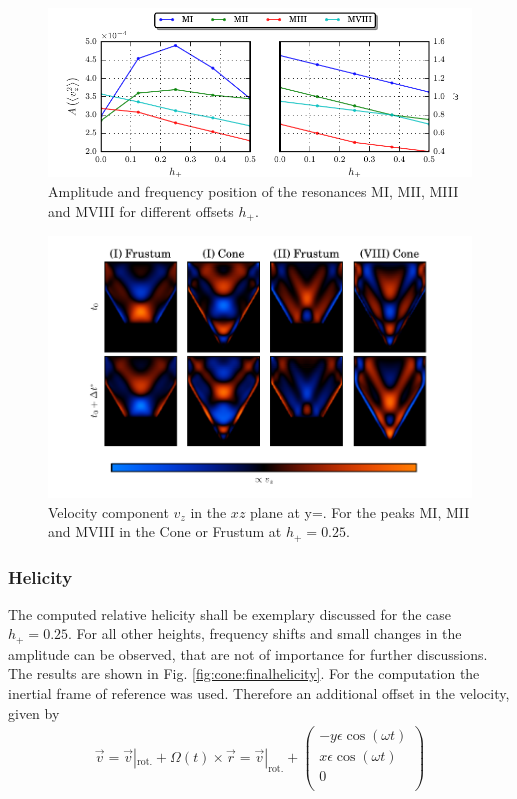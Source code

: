 \begin{figure}[!tp]
  \centering
  \includegraphics{gfx/cone/final/amp_pos.pdf}
  \caption{
      \label{fig:cone:finalampmax}
      Amplitude and frequency position of the resonances M\RN{1}, M\RN{2}, M\RN{3} and M\RN{8}
      for different offsets $h_+$.
    }
\end{figure}
\begin{figure}[!bp]
  \centering
  \includegraphics{gfx/cone/final/modes.pdf}
  \caption{
      \label{fig:cone:finalmodesexp}
      Velocity component $v_z$ in the $xz$ plane at y=.
       For the peaks M\RN{1}, M\RN{2} and M\RN{8} in the Cone or Frustum at $h_+=0.25$.
    }
\end{figure}
\clearpage

\subsubsection{Helicity}

The computed relative helicity shall be exemplary discussed for  the case ${h_+=0.25}$.
For all other heights, frequency shifts and small changes in the amplitude can be observed,
that are not of importance for further discussions.
The results are shown in Fig. \ref{fig:cone:finalhelicity}.
For the computation the inertial frame of reference was used.
Therefore an additional offset in the velocity,  given by
\begin{align}
    \vec{v} = \vec{v}|_{\text{rot.}} + \Omega(t) \times \vec{r} = \vec{v}|_{\text{rot.}} +
     \begin{pmatrix}
           -y \epsilon \cos(\omega t) \\
           x \epsilon \cos(\omega t) \\
           0\\
         \end{pmatrix}
\end{align}


